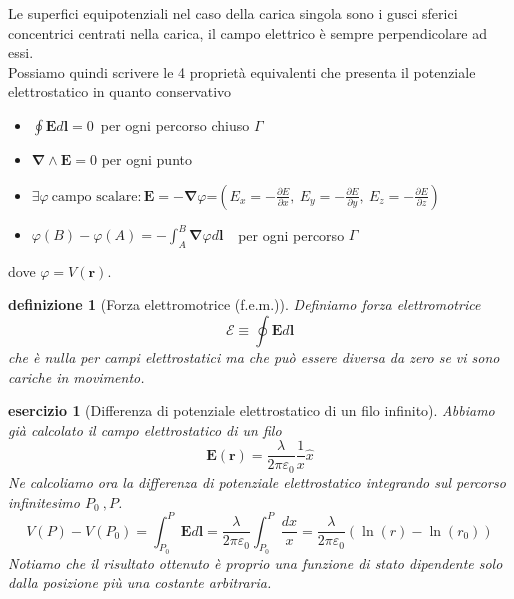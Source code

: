 \documentclass[10pt,a4paper]{article}
\newtheorem{esercizio}{esercizio}
\newtheorem{definizione}{definizione}
\begin{document}
Le superfici equipotenziali nel caso della carica singola sono i gusci sferici concentrici centrati nella carica, il campo elettrico è sempre perpendicolare ad essi.\\
Possiamo quindi scrivere le 4 proprietà equivalenti che presenta il potenziale elettrostatico in quanto conservativo
\begin{itemize}
	\item \(\oint \mathbf{E}d\mathbf{l} = 0 \)\ per ogni percorso chiuso $\Gamma$ 
	\item \(\mathbf{\nabla}\wedge\mathbf{E} = 0\) per ogni punto
	\item \(\exists\varphi\  \text{campo scalare} : \mathbf{E}=-\mathbf{\nabla}\varphi\)=$\left(E_x = -\frac{\partial E}{\partial x},\ E_y= - \frac{\partial E}{\partial y},\ E_z= -\frac{\partial E}{\partial z}\right)$
	\item \(\varphi(B)-\varphi(A) = -\int_{A}^{B}\mathbf{\nabla}\varphi d\mathbf{l}\ \) \ per ogni percorso $\Gamma$ 
\end{itemize}
dove $\varphi = V(\mathbf{r})$.
\begin{definizione}[Forza elettromotrice (f.e.m.)]
Definiamo forza elettromotrice
\[\mathcal{E} \equiv \oint \mathbf{E}d\mathbf{l}\]
che è nulla per campi elettrostatici ma che può essere diversa da zero se vi sono cariche in movimento.
\end{definizione}
\begin{esercizio}[Differenza di potenziale elettrostatico di un filo infinito]
Abbiamo già calcolato il campo elettrostatico di un filo
\[\mathbf{E}(\mathbf{r}) = \frac{\lambda}{2\pi\varepsilon_0}\frac{1}{x}\hat{x}\]
Ne calcoliamo ora la differenza di potenziale elettrostatico integrando sul percorso infinitesimo \(P_0\ , P\). 
\[V(P)-V(P_0) = \int_{P_0}^{P}\mathbf{E}d\mathbf{l} = \frac{\lambda}{2\pi\varepsilon_0} \int_{P_0}^{P}\frac{dx}{x}= \frac{\lambda}{2\pi\varepsilon_0} \left(\ln(r)-\ln(r_0)\right)\]
Notiamo che il risultato ottenuto è proprio una funzione di stato dipendente solo dalla posizione più una costante arbitraria.  
\end{esercizio}
\end{document}

